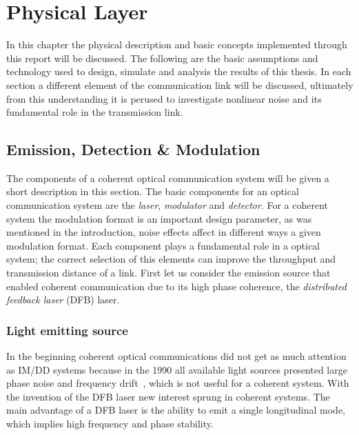 \chapter{Physical Layer}\label{ch:Phsic}
In this chapter the physical description and basic concepts implemented through this report will be discussed. The following are the basic assumptions and technology used to design, simulate and analysis the results of this thesis. In each section a different element of the communication link will be discussed, ultimately from this understanding it is perused to investigate nonlinear noise and its fundamental role in the transmission link. 
\section{Emission, Detection \& Modulation}
The components of a coherent optical communication system will be given a short description in this section. The basic components  for an optical communication system are the  \textit{laser}, \textit{modulator} and \textit{detector}. For a coherent system the modulation format is an important design parameter, as was mentioned in the introduction, noise effects affect in different ways a given modulation format. Each component plays a fundamental role in a optical system; the correct selection of this elements can improve the throughput and transmission distance of a link. First let us consider the emission source that enabled coherent communication due to its high phase coherence, the \textit{distributed feedback laser} (DFB) laser.  

\subsection{Light emitting source }

In the beginning coherent optical communications  did not get as much attention as IM/DD systems because in the 1990 all available  light sources presented large phase noise and frequency drift~\cite{kikuchi2010coherent}, which is not useful for a coherent system. With the invention of the DFB laser new interest sprung in coherent systems. The main advantage of a DFB laser is the ability to emit a single longitudinal mode, which implies high frequency and phase stability.
 
